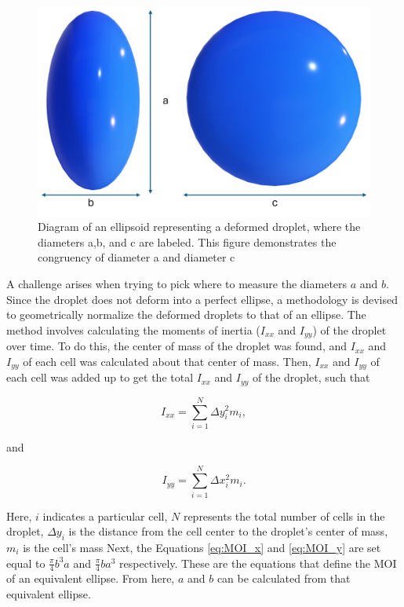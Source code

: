 \documentclass{UCF_ETD}
\begin{document}
\begin{figure}
    \centering
    \includegraphics[width=0.8\linewidth]{Figures/ellipsoid.png}
    \caption{Diagram of an ellipsoid representing a deformed droplet, where the diameters a,b, and c are labeled. This figure demonstrates the congruency of diameter a and diameter c}
    \label{fig:ellipsoid}
\end{figure}

A challenge arises when trying to pick where to measure the diameters $a$ and $b$. 
Since the droplet does not deform into a perfect ellipse, a methodology is devised to geometrically normalize the deformed droplets to that of an ellipse.
The method involves calculating the moments of inertia ($I_{xx}$ and $I_{yy}$)  of the droplet over time. 
To do this, the center of mass of the droplet was found, and $I_{xx}$ and $I_{yy}$ of each cell was calculated about that center of mass.
Then, $I_{xx}$ and $I_{yy}$ of each cell was added up to get the total $I_{xx}$ and $I_{yy}$ of the droplet, such that

\begin{equation}
    I_{xx} = \sum_{i=1}^{N} \Delta y_{i}^{2} m_{i},
    \label{eq:MOI_x}
\end{equation}

\noindent and 

\begin{equation}
    I_{yy} = \sum_{i=1}^{N} \Delta x_{i}^{2} m_{i}.
    \label{eq:MOI_y}
\end{equation}

Here, $i$ indicates a particular cell, $N$ represents the total number of cells in the droplet, $\Delta y_{i}$ is the distance from the cell center to the droplet's center of mass, $m_{i}$ is the cell's mass
Next, the Equations \ref{eq:MOI_x} and \ref{eq:MOI_y} are set equal to $\frac{\pi}{4} b^{3} a$ and $\frac{\pi}{4} b a^{3}$ respectively.
These are the equations that define the MOI of an equivalent ellipse. 
From here, $a$ and $b$ can be calculated from that equivalent ellipse.
\end{document}
